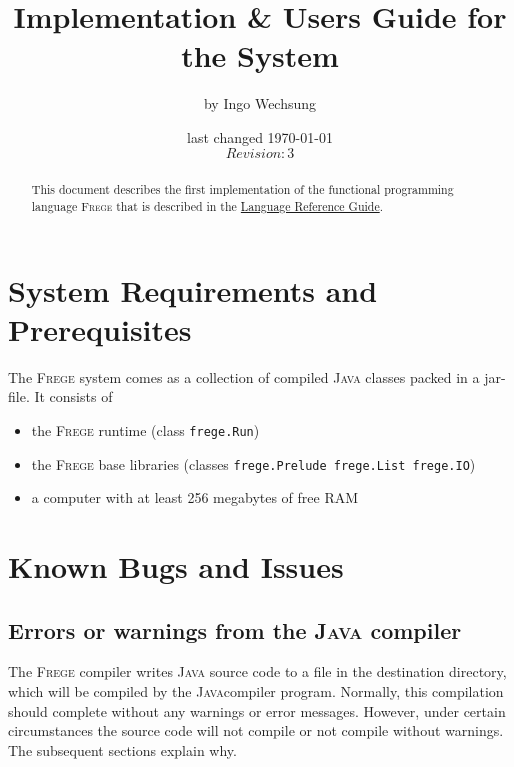 \documentclass[a4paper]{report}
\date{last changed \today{} \\ $Revision: 3 $}
\author{\small{by Ingo Wechsung}}
\title{Implementation \& Users Guide for the \frege{} System}
\newcommand{\frege}[0]{\textsc{Frege}}
\newcommand{\java}{\textsc{Java}}
\begin{document}
\maketitle

\begin{abstract}

This document describes the first implementation of
the functional programming language \frege{}
that is described in
the \href{file:./Language.pdf}{Language Reference Guide}.


\end{abstract}

\tableofcontents

\listoffigures

\chapter{System Requirements and Prerequisites}

The \frege{} system comes as a collection of compiled \java{} classes packed in a jar-file.
It consists of 
\begin{itemize}
\item the \frege{} runtime (class {\tt frege.Run})
\item the \frege{} base libraries (classes {\tt frege.Prelude frege.List frege.IO})
\end{itemize}

\begin{itemize}
\item a computer with at least 256 megabytes of free RAM
\end{itemize}


\chapter{Known Bugs and Issues}

\section{Errors or warnings from the \java{} compiler}

The \frege{} compiler writes \java{} source code to a file in the destination directory,
which will be compiled by the \java compiler program. Normally, this compilation
should complete without any warnings or error messages. However, under certain circumstances
the source code will not compile or not compile without warnings. The subsequent
sections explain why.
\end{document}
